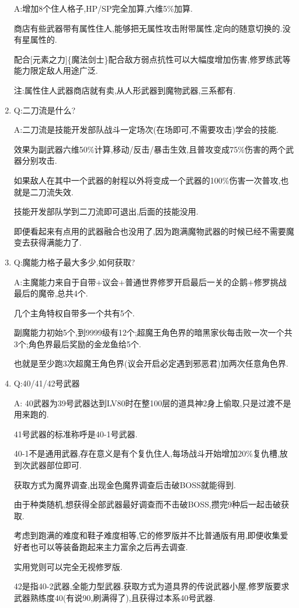 \begin{enumerate}
	A:增加8个住人格子,HP/SP完全加算,六维5\%加算.

	商店有些武器带有属性住人,能够把无属性攻击附带属性,定向的随意切换的{\color{red}{精灵破}}.没有星属性的.

	配合[元素之力]\{魔法剑士\}配合敌方弱点抗性可以大幅度增加伤害,修罗练武等能力限定敌人用途广泛.

	注:属性住人武器商店就有卖,从人形武器到魔物武器,三系都有.

	\item
	Q:二刀流是什么?

	A:二刀流是技能开发部队战斗一定场次(在场即可,不需要攻击)学会的技能.

	效果为副武器六维50\%计算,移动/反击/暴击生效,且普攻变成75\%伤害的两个武器分别攻击.

	如果敌人在其中一个武器的射程以外将变成一个武器的100\%伤害一次普攻,也就是二刀流失效.

	技能开发部队学到二刀流即可退出,后面的技能没用.

	即便看起来有点用的武器融合也没用了,因为跑满魔物武器的时候已经不需要魔变去获得满能力了.

	\item
	Q:魔能力格子最大多少,如何获取?

	A:主魔能力来自于自带+议会+普通世界修罗开启最后一关的企鹅+修罗挑战最后的魔帝,总共4个.

	几个主角特权自带多一个共有5个.
	
	副魔能力初始5个,到9999级有12个;超魔王角色界的暗黑家伙每击败一次一个共3个;角色界最后奖励的金龙鱼给5个.

	也就是至少跑3次超魔王角色界(议会开启必定遇到邪恶君)加两次任意角色界.

	\item
	Q:40/41/42号武器

	A:
	40武器为39号武器达到LV80时在整100层的道具神2身上偷取,只是过渡不是用来跑的.

	41号武器的标准称呼是40-1号武器.

	40-1不是通用武器,存在意义是有个复仇住人,每场战斗开始增加20\%复仇槽,放到次武器部位即可.

	获取方式为魔界调查,出现金色魔界调查后击破BOSS就能得到.

	由于种类随机,想获得全部武器最好调查而不击破BOSS,攒完9种后一起击破获取.

	考虑到跑满的难度和鞋子难度相等,它的修罗版并不比普通版有用,即便收集爱好者也可以等装备跑起来主力富余之后再去调查.

	实用党则可以完全无视修罗版.

	42是指40-2武器,全能力型武器.获取方式为道具界的传说武器小屋,修罗版要求武器熟练度40(有说90,刷满得了),且获得过本系40号武器.


\end{enumerate}

